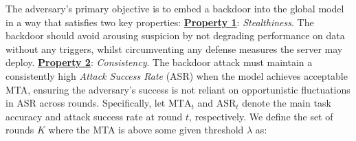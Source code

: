 The adversary's primary objective is to embed a backdoor into the global model in a way that satisfies two key properties:
\newline
\newline
\underline{\textbf{Property 1}}: \textit{Stealthiness}. The backdoor should avoid arousing suspicion by not degrading performance on data without any triggers, whilst circumventing any defense measures the server may deploy.
\newline
\newline
\underline{\textbf{Property 2}}: \textit{Consistency}. The backdoor attack must maintain a consistently high \textit{Attack Success Rate} (ASR) when the model achieves acceptable MTA, ensuring the adversary's success is not reliant on opportunistic fluctuations in ASR across rounds. Specifically, let \(\text{MTA}_t\) and \(\text{ASR}_t\) denote the main task accuracy and attack success rate at round \(t\), respectively. We define the set of rounds \(K\) where the MTA is above some given threshold \(\lambda\) as:  
